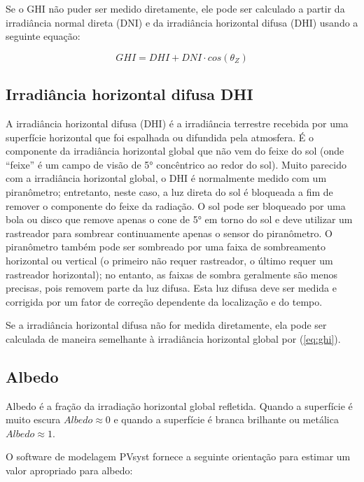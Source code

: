 Se o GHI não puder ser medido diretamente, ele pode ser calculado a partir da irradiância normal direta (DNI) e da irradiância horizontal difusa (DHI) usando a seguinte equação:

\begin{equation}
    GHI = DHI + DNI \cdot cos(\theta_Z)
    \label{eq:ghi}
\end{equation}

\subsection{Irradiância horizontal difusa  DHI}

A irradiância horizontal difusa (DHI) é a irradiância terrestre recebida por uma superfície horizontal que foi espalhada ou difundida pela atmosfera. É o componente da irradiância horizontal global que não vem do feixe do sol (onde “feixe” é um campo de visão de 5° concêntrico ao redor do sol). Muito parecido com a irradiância horizontal global, o DHI é normalmente medido com um piranômetro; entretanto, neste caso, a luz direta do sol é bloqueada a fim de remover o componente do feixe da radiação. O sol pode ser bloqueado por uma bola ou disco que remove apenas o cone de 5° em torno do sol e deve utilizar um rastreador para sombrear continuamente apenas o sensor do piranômetro. O piranômetro também pode ser sombreado por uma faixa de sombreamento horizontal ou vertical (o primeiro não requer rastreador, o último requer um rastreador horizontal); no entanto, as faixas de sombra geralmente são menos precisas, pois removem parte da luz difusa. Esta luz difusa deve ser medida e corrigida por um fator de correção dependente da localização e do tempo.

Se a irradiância horizontal difusa não for medida diretamente, ela pode ser calculada de maneira semelhante à irradiância horizontal global por (\ref{eq:ghi}).

\subsection{Albedo}

Albedo é a fração da irradiação horizontal global refletida. Quando a superfície é muito escura $Albedo \approx 0$ e quando a superfície é branca brilhante ou metálica $Albedo \approx 1$.

O software de modelagem PVsyst \cite{pvsyst} fornece a seguinte orientação para estimar um valor apropriado para albedo:

